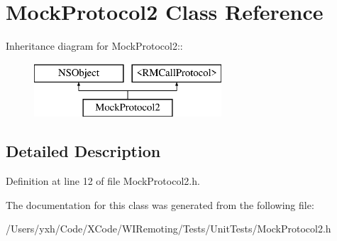 \hypertarget{interface_mock_protocol2}{
\section{MockProtocol2 Class Reference}
\label{interface_mock_protocol2}
}
Inheritance diagram for MockProtocol2::\begin{figure}[H]
\begin{center}
\leavevmode
\includegraphics[height=2cm]{interface_mock_protocol2}
\end{center}
\end{figure}


\subsection{Detailed Description}


Definition at line 12 of file MockProtocol2.h.

The documentation for this class was generated from the following file:\begin{DoxyCompactItemize}
\item 
/Users/yxh/Code/XCode/WIRemoting/Tests/UnitTests/MockProtocol2.h\end{DoxyCompactItemize}
